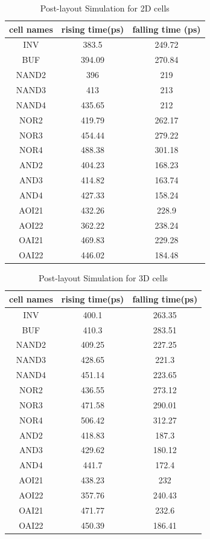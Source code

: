 \documentclass{article}
\begin{document}
\begin{table}
\centering
\begin{tabular}{|c|c|c|} 
\hline
cell names&rising time(ps)&falling time (ps) \\ \hline
INV&383.5&249.72 \\ \hline
BUF&394.09&270.84 \\ \hline
NAND2&396&219 \\ \hline
NAND3&413&213 \\ \hline
NAND4&435.65&212 \\ \hline
NOR2&419.79&262.17 \\ \hline
NOR3&454.44&279.22 \\ \hline
NOR4&488.38&301.18 \\ \hline
AND2&404.23&168.23 \\ \hline
AND3&414.82&163.74 \\ \hline
AND4&427.33&158.24 \\ \hline
AOI21&432.26&228.9 \\ \hline
AOI22&362.22&238.24 \\ \hline
OAI21&469.83&229.28 \\ \hline
OAI22&446.02&184.48 \\ \hline
\end{tabular}
\caption{Post-layout Simulation for 2D cells}
\label{tab:2postlayout}
\end{table}

\begin{table}
\centering
\begin{tabular}{|c|c|c|} 
\hline
cell names&rising time(ps)&falling time(ps) \\ \hline
INV&400.1&263.35 \\ \hline
BUF&410.3&283.51 \\ \hline
NAND2&409.25&227.25 \\ \hline
NAND3&428.65&221.3 \\ \hline
NAND4&451.14&223.65 \\ \hline
NOR2&436.55&273.12 \\ \hline
NOR3&471.58&290.01 \\ \hline
NOR4&506.42&312.27 \\ \hline
AND2&418.83&187.3 \\ \hline
AND3&429.62&180.12 \\ \hline
AND4&441.7&172.4 \\ \hline
AOI21&438.23&232 \\ \hline
AOI22&357.76&240.43 \\ \hline
OAI21&471.77&232.6 \\ \hline
OAI22&450.39&186.41 \\ \hline
\end{tabular}
\caption{Post-layout Simulation for 3D cells}
\label{tab:3postlayout}
\end{table}
\end{document}
